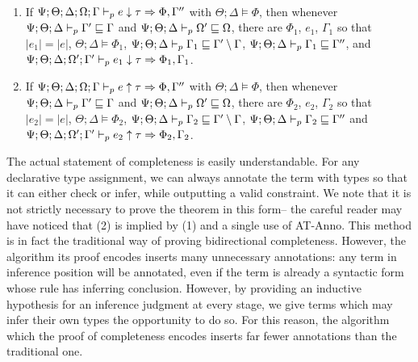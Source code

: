 \begin{theorem}
~\begin{enumerate}
  \item If $\Psi ; \Theta ; \Delta ; \Omega ; \Gamma \vdash_p e \downarrow \tau \Rightarrow \Phi,\Gamma''$ with $\Theta ; \Delta \vDash \Phi$, then whenever $\Psi ; \Theta ; \Delta \vdash_p \Gamma' \sqsubseteq \Gamma$ and $\Psi ; \Theta ; \Delta \vdash_p \Omega' \sqsubseteq \Omega$, there are $\Phi_1$, $e_1$, $\Gamma_1$ so that $|e_1| = |e|$, $\Theta ; \Delta \vDash \Phi_1$, $\Psi ; \Theta ; \Delta \vdash_p \Gamma_1 \sqsubseteq \Gamma' \setminus \Gamma$, $\Psi ; \Theta ; \Delta \vdash_p \Gamma_1 \sqsubseteq \Gamma''$, and $\Psi ; \Theta ; \Delta ; \Omega' ; \Gamma' \vdash_p e_1 \downarrow \tau \Rightarrow \Phi_1,\Gamma_1$.
  \item If $\Psi ; \Theta ; \Delta ; \Omega ; \Gamma \vdash_p e \uparrow \tau \Rightarrow \Phi,\Gamma''$ with $\Theta ; \Delta \vDash \Phi$, then whenever $\Psi ; \Theta ; \Delta \vdash_p \Gamma' \sqsubseteq \Gamma$ and $\Psi ; \Theta ; \Delta \vdash_p \Omega' \sqsubseteq \Omega$, there are $\Phi_2$, $e_2$, $\Gamma_2$ so that $|e_2| = |e|$, $\Theta ; \Delta \vDash \Phi_2$, $\Psi ; \Theta ; \Delta \vdash_p \Gamma_2 \sqsubseteq \Gamma' \setminus \Gamma$, $\Psi ; \Theta ; \Delta \vdash_p \Gamma_2 \sqsubseteq \Gamma''$ and $\Psi ; \Theta ; \Delta ; \Omega' ; \Gamma' \vdash_p e_2 \uparrow \tau \Rightarrow \Phi_2,\Gamma_2$.
\end{enumerate}
\label{thm:admits-weaken}
\end{theorem}

The actual statement of completeness is easily understandable. For any declarative type assignment, we can always annotate the term with types so that it can either check or infer, while outputting a valid constraint. We note that it is not strictly necessary to prove the theorem in this form-- the careful reader may have noticed that (2) is implied by (1) and a single use of AT-Anno. This method is in fact the traditional way of proving bidirectional completeness. However, the algorithm its proof encodes inserts many unnecessary annotations: any term in inference position will be annotated, even if the term is already a syntactic form whose rule has inferring conclusion. However, by providing an inductive hypothesis for an inference judgment at every stage, we give terms which may infer their own types the opportunity to do so. For this reason, the algorithm which the proof of completeness encodes inserts far fewer annotations than the traditional one.

